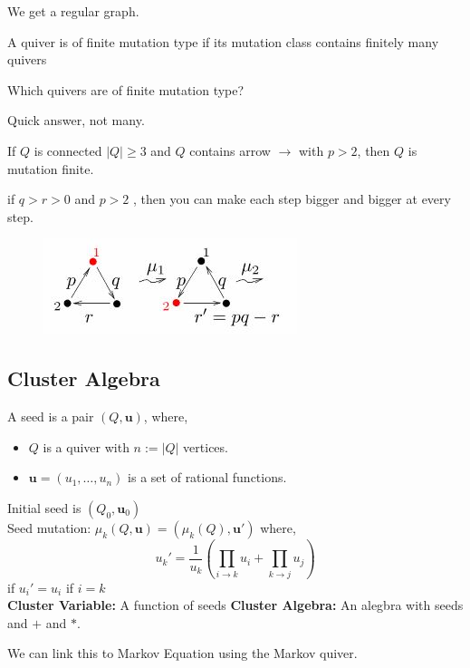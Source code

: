 \documentclass{article}
\begin{document}
We get a regular graph.
\newpage
\begin{ndefi}[]
  A quiver is of finite mutation type if its mutation class contains finitely many quivers
\end{ndefi}

\begin{question}
  Which quivers are of finite mutation type?
\end{question}

Quick answer, not many.

\begin{nlemma}[]
  If $Q$ is connected $|Q| \ge 3$ and $Q$ contains arrow $\longrightarrow$ with $p > 2$, then $Q$ is mutation finite.
\end{nlemma}

if $q > r > 0$ and $p > 2$ , then you can make each step bigger and bigger at every step.
\begin{figure}[!ht]
\centering
\includegraphics{./figures/L3.5}
\end{figure}

\subsection{Cluster Algebra}

\begin{ndefi}[Seed]
  A seed is a pair $(Q, \mathbf{u})$, where,
  \begin{itemize}
    \item $Q$ is a quiver with $n := |Q|$ vertices.
    \item $\mathbf{u} = (u_1, \dots, u_n)$ is a set of rational functions.
  \end{itemize}
  Initial seed is $(Q_0, \mathbf{u}_0)$\\
  Seed mutation: $\mu_k(Q, \mathbf{u}) = (\mu_k(Q), \mathbf{u}')$ where,
  $$ u_k' = \frac{1}{u_k}\left( \prod_{i \to k} u_i + \prod_{k \to j} u_j \right) $$
  if $u_i' = u_i$ if $i = k$\\
  \textbf{Cluster Variable:} A function of seeds
  \textbf{Cluster Algebra:} An alegbra with seeds and $+$ and $*$.
\end{ndefi}

We can link this to Markov Equation using the Markov quiver.
\end{document}
